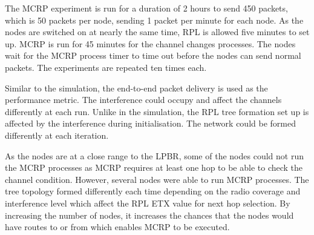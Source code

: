 
The MCRP experiment is run for a duration of 2 hours to send 450 packets, which is 50 packets per node, sending 1 packet per minute for each node. As the nodes are switched on at nearly the same time, RPL is allowed five minutes to set up. MCRP is run for 45 minutes for the channel changes processes. The nodes wait for the MCRP process timer to time out before the nodes can send normal packets. 
The experiments are repeated ten times each. %



Similar to the simulation, the end-to-end packet delivery is used as the performance metric.
The interference could occupy and affect the channels differently at each run. Unlike in the simulation, the RPL tree formation set up is affected by the interference during initialisation. The network could be formed differently at each iteration.

As the nodes are at a close range to the LPBR, some of the nodes could not run the MCRP processes as MCRP requires at least one hop to be able to check the channel condition. However, several nodes were able to run MCRP processes. The tree topology formed differently each time depending on the radio coverage and interference level which affect the RPL ETX value for next hop selection. By increasing the number of nodes, it increases the chances that the nodes would have routes to or from which enables MCRP to be executed.

